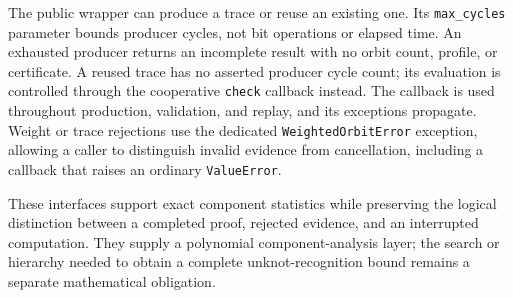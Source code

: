 The public wrapper can produce a trace or reuse an existing one.  Its
\texttt{max\_cycles} parameter bounds producer cycles, not bit operations or
elapsed time.  An exhausted producer returns an incomplete result with no
orbit count, profile, or certificate.  A reused trace has no asserted producer
cycle count; its evaluation is controlled through the cooperative
\texttt{check} callback instead.  The callback is used throughout production,
validation, and replay, and its exceptions propagate.  Weight or trace
rejections use the dedicated \texttt{WeightedOrbitError} exception, allowing
a caller to distinguish invalid evidence from cancellation, including a
callback that raises an ordinary \texttt{ValueError}.

These interfaces support exact component statistics while preserving the
logical distinction between a completed proof, rejected evidence, and an
interrupted computation.  They supply a polynomial component-analysis layer;
the search or hierarchy needed to obtain a complete unknot-recognition bound
remains a separate mathematical obligation.
